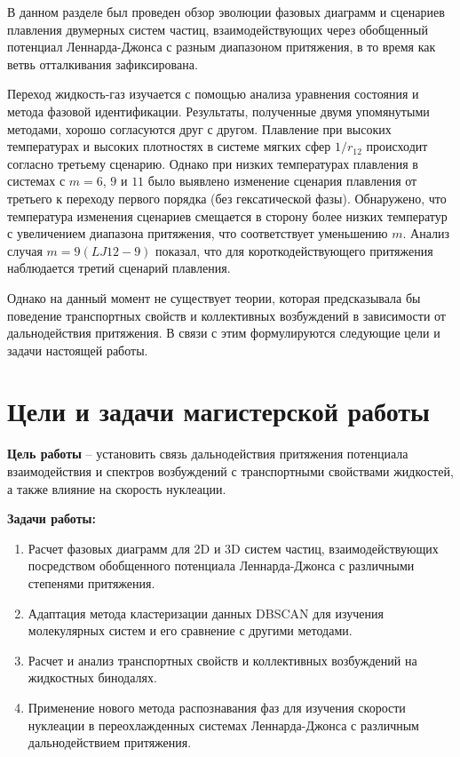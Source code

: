 В данном разделе был проведен обзор эволюции фазовых диаграмм и сценариев плавления двумерных систем частиц, взаимодействующих через обобщенный потенциал Леннарда-Джонса с разным диапазоном притяжения, в то время как ветвь отталкивания зафиксирована.

Переход жидкость-газ изучается с помощью анализа уравнения состояния и метода фазовой идентификации.
Результаты, полученные двумя упомянутыми методами, хорошо согласуются друг с другом.
Плавление при высоких температурах и высоких плотностях в системе мягких сфер $1/r_{12}$ происходит согласно третьему сценарию. 
Однако при низких температурах плавления в системах с $m = 6$, $9$ и $11$ было выявлено изменение сценария плавления от третьего к переходу первого порядка (без гексатической фазы).
Обнаружено, что температура изменения сценариев смещается в сторону более низких температур с увеличением диапазона притяжения, что соответствует уменьшению $m$. 
Анализ случая $m = 9 (LJ12-9)$  показал, что для короткодействующего притяжения наблюдается третий сценарий плавления.

Однако на данный момент не существует теории, которая предсказывала бы поведение транспортных свойств и коллективных возбуждений в зависимости от дальнодействия притяжения.
В связи с этим формулируются следующие цели и задачи настоящей работы.

\section{Цели и задачи магистерской работы}

\textbf{Цель работы} -- установить связь дальнодействия притяжения потенциала взаимодействия и спектров возбуждений с транспортными свойствами жидкостей, а также влияние на скорость нуклеации.

\textbf{Задачи работы:}
\begin{enumerate}
    \item Расчет фазовых диаграмм для 2D и 3D систем частиц, взаимодействующих посредством обобщенного потенциала Леннарда-Джонса с различными степенями притяжения.
    \item Адаптация метода кластеризации данных DBSCAN для изучения молекулярных систем и его сравнение с другими методами.
    \item Расчет и анализ транспортных свойств и коллективных возбуждений на жидкостных бинодалях.
    \item Применение нового метода распознавания фаз для изучения скорости нуклеации в переохлажденных системах Леннарда-Джонса с различным дальнодействием притяжения.
\end{enumerate}
